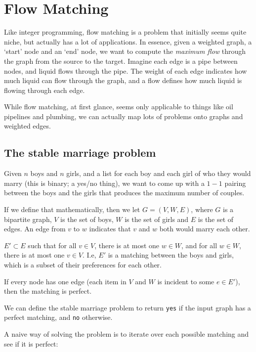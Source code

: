 \section{Flow Matching}

Like integer programming, flow matching is a problem that initially seems quite
niche, but actually has a lot of applications. In essence, given a weighted
graph, a `start' node and an `end' node, we want to compute the \textit{maximum
flow} through the graph from the source to the target. Imagine each edge is a
pipe between nodes, and liquid flows through the pipe. The weight of each edge
indicates how much liquid can flow through the graph, and a flow defines how
much liquid is flowing through each edge.

While flow matching, at first glance, seems only applicable to things like oil
pipelines and plumbing, we can actually map lots of problems onto graphs and
weighted edges.

\subsection{The stable marriage problem}

Given $n$ boys and $n$ girls, and a list for each boy and each girl of who they
would marry (this is binary; a yes/no thing), we want to come up with a $1-1$
pairing between the boys and the girls that produces the maximum number of
couples.

If we define that mathematically, then we let $G = (V, W, E)$, where $G$ is a
bipartite graph, $V$ is the set of boys, $W$ is the set of girls and $E$ is the
set of edges. An edge from $v$ to $w$ indicates that $v$ and $w$ both would
marry each other.

$E' \subset E$ such that for all $v \in V$, there is at most one $w \in W$, and
for all $w \in W$, there is at most one $v \in V$. I.e, $E'$ is a matching
between the boys and girls, which is a subset of their preferences for each
other.

If every node has one edge (each item in $V$ and $W$ is incident to some $e \in
E'$), then the matching is perfect.

We can define the stable marriage problem to return \texttt{yes} if the input
graph has a perfect matching, and \texttt{no} otherwise.

A naive way of solving the problem is to iterate over each possible matching and
see if it is perfect:

